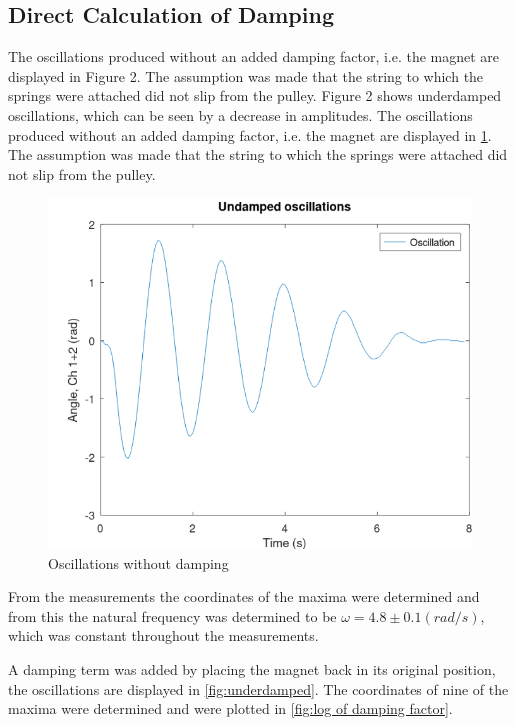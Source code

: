 \subsection{Direct Calculation of Damping} \label{sec:direct_damping}

The oscillations produced without an added damping factor, i.e. the magnet are displayed in Figure 2. The assumption was made that the string to which the springs were attached did not slip from the pulley. Figure 2 shows underdamped oscillations, which can be seen by a decrease in amplitudes. The oscillations produced without an added damping factor, i.e. the magnet are displayed in \ref{fig:undamped_oscillations}. The assumption was made that the string to which the springs were attached did not slip from the pulley.

\begin{figure}[h!]
  \centering
  \includegraphics[width=1\textwidth]{oscillations/images/Undamped_Oscillations}
  \caption{Oscillations without damping}
  \label{fig:undamped_oscillations}
\end{figure}

From the measurements the coordinates of the maxima were determined and from this the natural frequency was determined to be $\omega = 4.8 \pm 0.1 (rad/s)$, which was constant throughout the measurements.

A damping term was added by placing the magnet back in its original position, the oscillations are displayed in \ref{fig:underdamped}. The coordinates of nine of the maxima were determined and were plotted in \ref{fig:log of damping factor}. 

